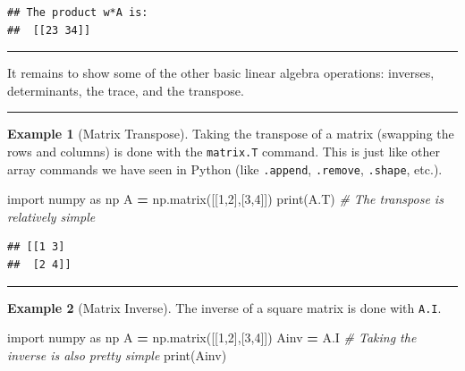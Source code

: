 \documentclass[
]{book}
\newenvironment{Shaded}{\begin{snugshade}}{\end{snugshade}}
\newcommand{\BuiltInTok}[1]{#1}
\newcommand{\CommentTok}[1]{\textcolor[rgb]{0.56,0.35,0.01}{\textit{#1}}}
\newcommand{\DecValTok}[1]{\textcolor[rgb]{0.00,0.00,0.81}{#1}}
\newcommand{\ImportTok}[1]{#1}
\newcommand{\NormalTok}[1]{#1}
\newcommand{\OperatorTok}[1]{\textcolor[rgb]{0.81,0.36,0.00}{\textbf{#1}}}
\theoremstyle{definition}
\theoremstyle{definition}
\newtheorem{example}{Example}[chapter]
\theoremstyle{definition}
\theoremstyle{remark}
\begin{document}
\begin{verbatim}
## The product w*A is:
##  [[23 34]]
\end{verbatim}

\begin{center}\rule{0.5\linewidth}{0.5pt}\end{center}

It remains to show some of the other basic linear algebra operations:
inverses, determinants, the trace, and the transpose.

\begin{center}\rule{0.5\linewidth}{0.5pt}\end{center}

\begin{example}[Matrix Transpose]
\protect\hypertarget{exm:unnamed-chunk-729}{}{\label{exm:unnamed-chunk-729} {} }Taking the transpose of a matrix (swapping the rows and columns) is done with the \texttt{matrix.T} command. This is just like other array commands we have seen in Python (like \texttt{.append}, \texttt{.remove}, \texttt{.shape}, etc.).
\end{example}

\begin{Shaded}
\begin{Highlighting}[]
\ImportTok{import}\NormalTok{ numpy }\ImportTok{as}\NormalTok{ np}
\NormalTok{A }\OperatorTok{=}\NormalTok{ np.matrix([[}\DecValTok{1}\NormalTok{,}\DecValTok{2}\NormalTok{],[}\DecValTok{3}\NormalTok{,}\DecValTok{4}\NormalTok{]])}
\BuiltInTok{print}\NormalTok{(A.T) }\CommentTok{\# The transpose is relatively simple}
\end{Highlighting}
\end{Shaded}

\begin{verbatim}
## [[1 3]
##  [2 4]]
\end{verbatim}

\begin{center}\rule{0.5\linewidth}{0.5pt}\end{center}

\begin{example}[Matrix Inverse]
\protect\hypertarget{exm:unnamed-chunk-731}{}{\label{exm:unnamed-chunk-731} {} }The inverse of a square matrix is done with \texttt{A.I}.
\end{example}

\begin{Shaded}
\begin{Highlighting}[]
\ImportTok{import}\NormalTok{ numpy }\ImportTok{as}\NormalTok{ np}
\NormalTok{A }\OperatorTok{=}\NormalTok{ np.matrix([[}\DecValTok{1}\NormalTok{,}\DecValTok{2}\NormalTok{],[}\DecValTok{3}\NormalTok{,}\DecValTok{4}\NormalTok{]])}
\NormalTok{Ainv }\OperatorTok{=}\NormalTok{ A.I }\CommentTok{\# Taking the inverse is also pretty simple}
\BuiltInTok{print}\NormalTok{(Ainv)}
\end{Highlighting}
\end{Shaded}
\end{document}

